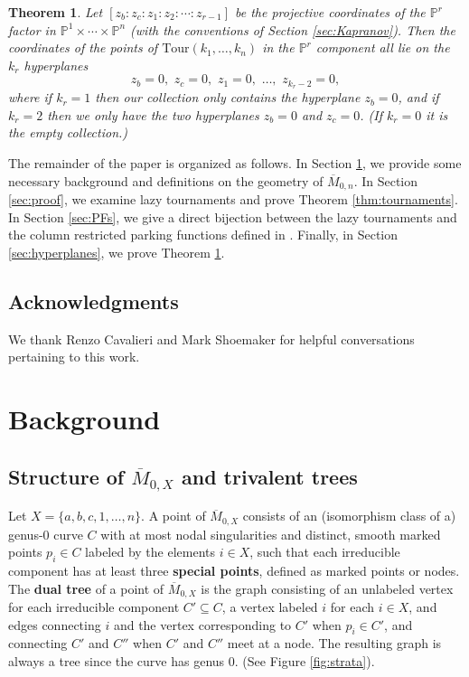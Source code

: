 \documentclass[11pt]{amsart}
\newcommand{\Mbar}{\overline{M}}
\newcommand{\PP}{\mathbb{P}}
\newcommand{\Tour}{\mathrm{Tour}}
\newtheorem{thm}{Theorem}
\numberwithin{thm}{section}
\numberwithin{equation}{section}
\numberwithin{figure}{section}
\theoremstyle{definition}
\begin{document}
\begin{thm}\label{thm:simple-hyperplanes}
Let $[z_b:z_c:z_1:z_2:\cdots:z_{r-1}]$ be the projective coordinates of the $\PP^r$ factor in $\PP^1\times \cdots \times \PP^n$ (with the conventions of Section \ref{sec:Kapranov}).  Then the coordinates of the points of $\Tour(k_1,\ldots,k_n)$ in the $\PP^r$ component all lie on the $k_r$ hyperplanes
$$z_b=0,\,\, z_c=0,\,\, z_1=0,\,\, \ldots,\,\, z_{k_r-2}=0,$$ where if $k_r=1$ then our collection only contains the hyperplane $z_b=0$, and if $k_r=2$ then we only have the two hyperplanes $z_b=0$ and $z_c=0$.  (If $k_r=0$ it is the empty collection.)
\end{thm}


The remainder of the paper is organized as follows.  In Section \ref{sec:background}, we provide some necessary background and definitions on the geometry of $\Mbar_{0,n}$.  In Section \ref{sec:proof}, we examine lazy tournaments and prove Theorem \ref{thm:tournaments}. In Section \ref{sec:PFs}, we give a direct bijection between the lazy tournaments and the column restricted parking functions defined in \cite{CGM}. Finally, in Section \ref{sec:hyperplanes}, we prove Theorem \ref{thm:simple-hyperplanes}.

\subsection{Acknowledgments}

We thank Renzo Cavalieri and Mark Shoemaker for helpful conversations pertaining to this work. 

\section{Background}\label{sec:background}

\subsection{Structure of $\Mbar_{0,X}$ and trivalent trees}

Let $X=\{a, b, c, 1, \ldots, n\}$. A point of $\Mbar_{0,X}$ consists of an (isomorphism class of a) genus-$0$ curve $C$ with at most nodal singularities and distinct, smooth marked points $p_i \in C$ labeled by the elements $i \in X$, such that each irreducible component has at least three \textbf{special points}, defined as marked points or nodes. The \textbf{dual tree} of a point of $\Mbar_{0,X}$ is the graph consisting of an unlabeled vertex for each irreducible component $C' \subseteq C$, a vertex labeled $i$ for each $i \in X$, and edges connecting $i$ and the vertex corresponding to $C'$ when $p_i \in C'$, and connecting $C'$ and $C''$ when $C'$ and $C''$ meet at a node. The resulting graph is always a tree since the curve has genus $0$. (See Figure \ref{fig:strata}).
\end{document}
